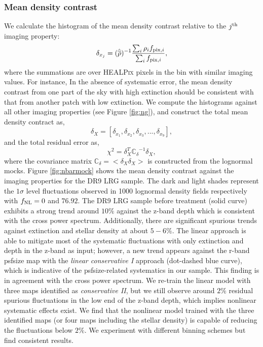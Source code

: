 \subsubsection{Mean density contrast}
We calculate the histogram of the mean density contrast relative to the $j^{\rm th}$ imaging property:
\begin{equation}
\delta_{x_{j}} = ({\hat{\overline{\rho}}})^{-1} \frac{\sum_{i} \rho_{i} f_{{\rm pix}, i}}{\sum_{i} f_{{\rm pix}, i}},
\end{equation}
where the summations are over \textsc{HEALPix} pixels in the bin with similar imaging values. For instance, In the absence of systematic error, the mean density contrast from one part of the sky with high extinction should be consistent with that from another patch with low extinction. We compute the histograms against all other imaging properties (see Figure \ref{fig:ng}), and construct the total mean density contract as,
\begin{equation}
\delta_{X} = [\delta_{x_{1}}, \delta_{x_{2}}, \delta_{x_{3}}, ..., \delta_{x_{9}}],
\end{equation}
and the total residual error as,
\begin{equation}
\chi^{2} = \delta_{X}^{T} \mathbb{C_{\delta}}^{-1} \delta_{X},
\end{equation}
where the covariance matrix $\mathbb{C}_{\delta} = < \delta_{X} \delta_{X}>$ is constructed from the lognormal mocks. Figure \ref{fig:nbarmock} shows the mean density contrast against the imaging properties for the DR9 LRG sample. The dark and light shades represent the $1\sigma$ level fluctuations observed in 1000 lognormal density fields respectively with $f_{\rm NL}=0$ and $76.92$. The DR9 LRG sample before treatment (solid curve) exhibits a strong trend around $10\%$ against the z-band depth which is consistent with the cross power spectrum. Additionally, there are significant spurious trends against extinction and stellar density at about $5-6\%$. The linear approach is able to mitigate most of the systematic fluctuations with only extinction and depth in the z-band as input; however,  a new trend appears against the r-band psfsize map with the \textit{linear conservative I} approach (dot-dashed blue curve), which is indicative of the psfsize-related systematics in our sample. This finding is in agreement with the cross power spectrum. We re-train the linear model with three maps identified as \textit{conservative II}, but we still observe around $2\%$ residual spurious fluctuations in the low end of the z-band depth, which implies nonlinear systematic effects exist. We find that the nonlinear model trained with the three identified maps (or four maps including the stellar density) is capable of reducing the fluctuations below $2\%$. We experiment with different binning schemes but find consistent results.


